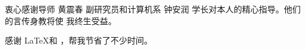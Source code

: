 \begin{acknowledgement}
  衷心感谢导师 黄震春 副研究员和计算机系 钟安润 学长对本人的精心指导。他们的言传身教将使
  我终生受益。

  感谢 \LaTeX 和 \thuthesis\cite{thuthesis}，帮我节省了不少时间。
\end{acknowledgement}
